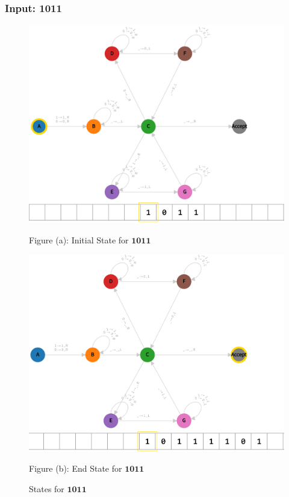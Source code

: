\vspace*{\fill}

\subsubsection*{Input: 1011}
\label{q2-1011}

\begin{figure}[ht]
  \centering
  \begin{minipage}{.49\linewidth}
    \centering
    \includegraphics[width=\linewidth]{answers/img/q2-1011-initial.png}
    \caption*{Figure (a): Initial State for $\mathbf{1011}$}
    \label{fig:1011-initial}
  \end{minipage}
  \begin{minipage}{.49\linewidth}
    \centering
    \includegraphics[width=\linewidth]{answers/img/q2-1011-end.png}
    \caption*{Figure (b): End State for $\mathbf{1011}$}
    \label{fig:1011-end}
  \end{minipage}
  \caption{States for $\mathbf{1011}$}
  \label{fig:in-1011}
\end{figure}


